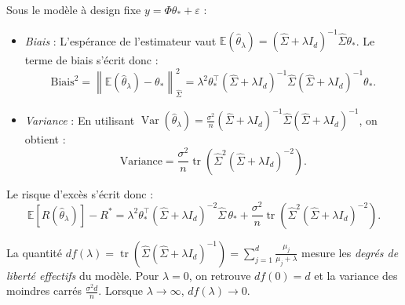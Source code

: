 \begin{proposition}
    Sous le modèle à design fixe $y = \Phi \theta_* + \varepsilon$ :
    \begin{itemize}
        \item \emph{Biais} : L'espérance de l'estimateur vaut $\mathbb{E}(\hat{\theta}_\lambda) = (\hat{\Sigma} + \lambda I_d)^{-1} \hat{\Sigma} \theta_*$. Le terme de biais s'écrit donc :
        \begin{equation}
            \text{Biais}^2 = \left\| \mathbb{E}(\hat{\theta}_\lambda) - \theta_* \right\|_{\hat{\Sigma}}^2 = \lambda^2 \theta_*^\top \left(\hat{\Sigma} + \lambda I_d\right)^{-1} \hat{\Sigma} \left(\hat{\Sigma} + \lambda I_d\right)^{-1} \theta_*.
        \end{equation}
        \item \emph{Variance} : En utilisant $\operatorname{Var}(\hat{\theta}_\lambda) = \frac{\sigma^2}{n} (\hat{\Sigma} + \lambda I_d)^{-1} \hat{\Sigma} (\hat{\Sigma} + \lambda I_d)^{-1}$, on obtient :
        \begin{equation}
            \text{Variance} = \frac{\sigma^2}{n} \operatorname{tr}\left( \hat{\Sigma}^2 \left(\hat{\Sigma} + \lambda I_d\right)^{-2} \right).
        \end{equation}
    \end{itemize}
    Le risque d'excès s'écrit donc :
    \begin{equation}
        \mathbb{E}\left[ R(\hat{\theta}_\lambda) \right] - R^* = \lambda^2 \theta_*^\top \left(\hat{\Sigma} + \lambda I_d\right)^{-2} \hat{\Sigma} \, \theta_* + \frac{\sigma^2}{n} \operatorname{tr}\left( \hat{\Sigma}^2 \left(\hat{\Sigma} + \lambda I_d\right)^{-2} \right).
    \end{equation}
\end{proposition}

\begin{remark}
    La quantité $df(\lambda) = \operatorname{tr}\left( \hat{\Sigma} (\hat{\Sigma} + \lambda I_d)^{-1} \right) = \sum_{j=1}^d \frac{\mu_j}{\mu_j + \lambda}$ mesure les \emph{degrés de liberté effectifs} du modèle. Pour $\lambda = 0$, on retrouve $df(0) = d$ et la variance des moindres carrés $\frac{\sigma^2 d}{n}$. Lorsque $\lambda \to \infty$, $df(\lambda) \to 0$.
\end{remark}

